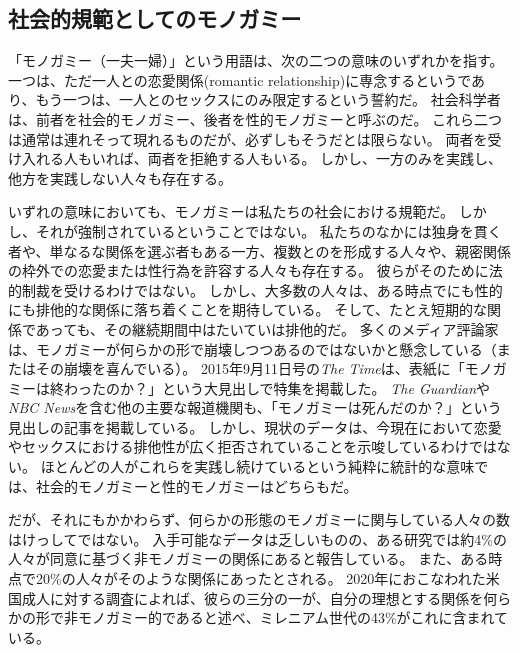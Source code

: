 \documentclass[paper=a4,book,openany]{jlreq}
\begin{document}
\subsection{社会的規範としてのモノガミー}

「{モノガミー}（一夫一婦）」という用語は、次の二つの意味のいずれかを指す。
一つは、ただ一人との恋愛関係(romantic relationship)に専念するというであり、もう一つは、一人とのセックスにのみ限定するという誓約だ。
社会科学者は、前者を社会的モノガミー、後者を性的モノガミーと呼ぶのだ。
これら二つは通常は連れそって現れるものだが、必ずしもそうだとは限らない。
両者を受け入れる人もいれば、両者を拒絶する人もいる。
しかし、一方のみを実践し、他方を実践しない人々も存在する。

いずれの意味においても、モノガミーは私たちの社会における規範だ。
しかし、それが強制されているということではない。
私たちのなかには独身を貫く者や、単なるな関係を選ぶ者もある一方、複数とのを形成する人々や、親密関係の枠外での恋愛または性行為を許容する人々も存在する。
彼らがそのために法的制裁を受けるわけではない。
しかし、大多数の人々は、ある時点でにも性的にも排他的な関係に落ち着くことを期待している。
そして、たとえ短期的な関係であっても、その継続期間中はたいていは排他的だ。
多くのメディア評論家は、モノガミーが何らかの形で崩壊しつつあるのではないかと懸念している（またはその崩壊を喜んでいる）。
2015年9月11日号の\emph{The Time}は、表紙に「モノガミーは終わったのか？」という大見出しで特集を掲載した\citep{magazine15:_is_monog_over}。
\emph{The Guardian}や\emph{NBC News}を含む他の主要な報道機関も、「モノガミーは死んだのか？」という見出しの記事を掲載している\citep{alexander05:_is_monog_dead,jeffries12:_sex_issue}。
しかし、現状のデータは、今現在において恋愛やセックスにおける排他性が広く拒否されていることを示唆しているわけではない。
ほとんどの人がこれらを実践し続けているという純粋に統計的な意味では、社会的モノガミーと性的モノガミーはどちらもだ。

だが、それにもかかわらず、何らかの形態のモノガミーに関与している人々の数はけっしてではない。
入手可能なデータは乏しいものの、ある研究では約4\%の人々が同意に基づく非モノガミーの関係にあると報告している。
また、ある時点で20\%の人々がそのような関係にあったとされる\citep{haupert17:_preval_exper_consen_nonmon_relat}。
2020年におこなわれた米国成人に対する調査によれば、彼らの三分の一が、自分の理想とする関係を何らかの形で非モノガミー的であると述べ、ミレニアム世代の43\%がこれに含まれている\citep{ballard20:_millen_are_less_likel_want_monog_relat}。
\end{document}
